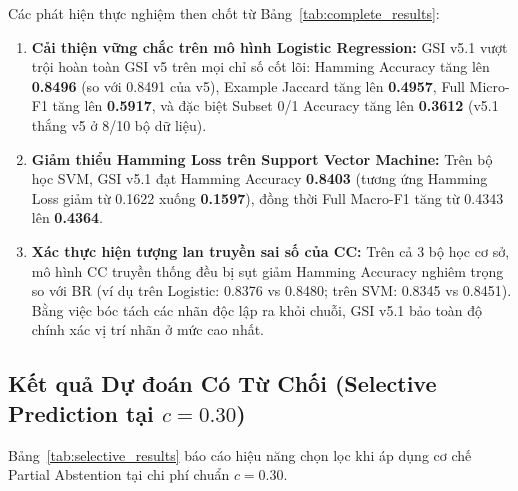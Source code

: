 \documentclass[11pt,a4paper]{article}
\begin{document}
\noindent Các phát hiện thực nghiệm then chốt từ Bảng~\ref{tab:complete_results}:
\begin{enumerate}
    \item \textbf{Cải thiện vững chắc trên mô hình Logistic Regression:} GSI v5.1 vượt trội hoàn toàn GSI v5 trên mọi chỉ số cốt lõi: Hamming Accuracy tăng lên \textbf{0.8496} (so với 0.8491 của v5), Example Jaccard tăng lên \textbf{0.4957}, Full Micro-F1 tăng lên \textbf{0.5917}, và đặc biệt Subset 0/1 Accuracy tăng lên \textbf{0.3612} (v5.1 thắng v5 ở 8/10 bộ dữ liệu).
    \item \textbf{Giảm thiểu Hamming Loss trên Support Vector Machine:} Trên bộ học SVM, GSI v5.1 đạt Hamming Accuracy \textbf{0.8403} (tương ứng Hamming Loss giảm từ 0.1622 xuống \textbf{0.1597}), đồng thời Full Macro-F1 tăng từ 0.4343 lên \textbf{0.4364}.
    \item \textbf{Xác thực hiện tượng lan truyền sai số của CC:} Trên cả 3 bộ học cơ sở, mô hình CC truyền thống đều bị sụt giảm Hamming Accuracy nghiêm trọng so với BR (ví dụ trên Logistic: 0.8376 vs 0.8480; trên SVM: 0.8345 vs 0.8451). Bằng việc bóc tách các nhãn độc lập ra khỏi chuỗi, GSI v5.1 bảo toàn độ chính xác vị trí nhãn ở mức cao nhất.
\end{enumerate}

\subsection{Kết quả Dự đoán Có Từ Chối (Selective Prediction tại \texorpdfstring{$c = 0.30$}{c = 0.30})}
Bảng~\ref{tab:selective_results} báo cáo hiệu năng chọn lọc khi áp dụng cơ chế Partial Abstention tại chi phí chuẩn $c = 0.30$.
\end{document}
